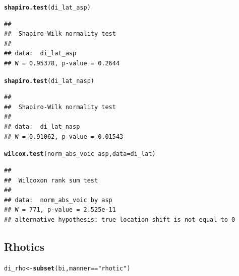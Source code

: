 \documentclass[a4paper,11pt]{article}\usepackage[]{graphicx}\usepackage[]{color}
\makeatletter
\newcommand{\hlstr}[1]{\textcolor[rgb]{0.192,0.494,0.8}{#1}}%
\newcommand{\hlopt}[1]{\textcolor[rgb]{0,0,0}{#1}}%
\newcommand{\hlstd}[1]{\textcolor[rgb]{0.345,0.345,0.345}{#1}}%
\newcommand{\hlkwb}[1]{\textcolor[rgb]{0.69,0.353,0.396}{#1}}%
\newcommand{\hlkwc}[1]{\textcolor[rgb]{0.333,0.667,0.333}{#1}}%
\newcommand{\hlkwd}[1]{\textcolor[rgb]{0.737,0.353,0.396}{\textbf{#1}}}%
\newenvironment{kframe}{%
 \def\at@end@of@kframe{}%
 \ifinner\ifhmode%
  \def\at@end@of@kframe{\end{minipage}}%
  \begin{minipage}{\columnwidth}%
 \fi\fi%
 \def\FrameCommand##1{\hskip\@totalleftmargin \hskip-\fboxsep
 \colorbox{shadecolor}{##1}\hskip-\fboxsep
     \hskip-\linewidth \hskip-\@totalleftmargin \hskip\columnwidth}%
 \MakeFramed {\advance\hsize-\width
   \@totalleftmargin\z@ \linewidth\hsize
   \@setminipage}}%
 {\par\unskip\endMakeFramed%
 \at@end@of@kframe}
\newenvironment{knitrout}{}{} %
\makeatother
\begin{document}
\begin{knitrout}
\color{fgcolor}\begin{kframe}
\begin{alltt}
\hlkwd{shapiro.test}\hlstd{(di_lat_asp)}
\end{alltt}
\begin{verbatim}
## 
## 	Shapiro-Wilk normality test
## 
## data:  di_lat_asp
## W = 0.95378, p-value = 0.2644
\end{verbatim}
\begin{alltt}
\hlkwd{shapiro.test}\hlstd{(di_lat_nasp)}
\end{alltt}
\begin{verbatim}
## 
## 	Shapiro-Wilk normality test
## 
## data:  di_lat_nasp
## W = 0.91062, p-value = 0.01543
\end{verbatim}
\begin{alltt}
\hlkwd{wilcox.test}\hlstd{(norm_abs_voic} \hlopt{~} \hlstd{asp,} \hlkwc{data} \hlstd{= di_lat)}
\end{alltt}
\begin{verbatim}
## 
## 	Wilcoxon rank sum test
## 
## data:  norm_abs_voic by asp
## W = 771, p-value = 2.525e-11
## alternative hypothesis: true location shift is not equal to 0
\end{verbatim}
\end{kframe}
\end{knitrout}

\subsection{Rhotics}

\begin{knitrout}
\color{fgcolor}\begin{kframe}
\begin{alltt}
\hlstd{di_rho} \hlkwb{<-} \hlkwd{subset}\hlstd{(bi, manner} \hlopt{==} \hlstr{"rhotic"}\hlstd{)}
\end{alltt}
\end{kframe}
\end{knitrout}
\end{document}
